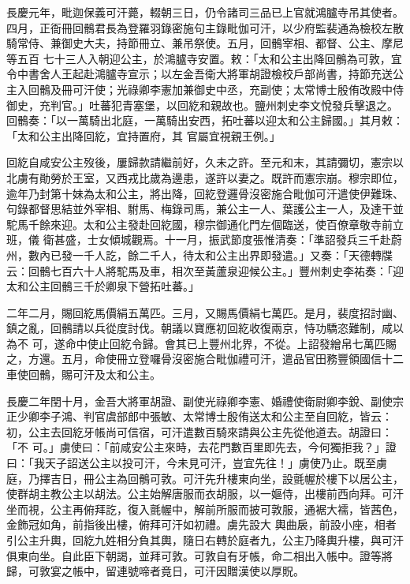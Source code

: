 \begin{pinyinscope}
 長慶元年，毗迦保義可汗薨，輟朝三日，仍令諸司三品已上官就鴻臚寺吊其使者。四月，正衙冊回鶻君長為登羅羽錄密施句主錄毗伽可汗，以少府監裴通為檢校左散騎常侍、兼御史大夫，持節冊立、兼吊祭使。五月，回鶻宰相、都督、公主、摩尼等五百
 七十三人入朝迎公主，於鴻臚寺安置。敕：「太和公主出降回鶻為可敦，宜令中書舍人王起赴鴻臚寺宣示；以左金吾衛大將軍胡證檢校戶部尚書，持節充送公主入回鶻及冊可汗使；光祿卿李憲加兼御史中丞，充副使；太常博士殷侑改殿中侍御史，充判官。」吐蕃犯青塞堡，以回紇和親故也。鹽州刺史李文悅發兵擊退之。回鶻奏：「以一萬騎出北庭，一萬騎出安西，拓吐蕃以迎太和公主歸國。」其月敕：「太和公主出降回紇，宜持置府，其
 官屬宜視親王例。」



 回紇自咸安公主歿後，屢歸款請繼前好，久未之許。至元和末，其請彌切，憲宗以北虜有勛勞於王室，又西戎比歲為邊患，遂許以妻之。既許而憲宗崩。穆宗即位，逾年乃封第十妹為太和公主，將出降，回紇登邏骨沒密施合毗伽可汗遣使伊難珠、句錄都督思結並外宰相、駙馬、梅錄司馬，兼公主一人、葉護公主一人，及達干並駝馬千餘來迎。太和公主發赴回紇國，穆宗御通化門左個臨送，使百僚章敬寺前立班，儀
 衛甚盛，士女傾城觀焉。十一月，振武節度張惟清奏：「準詔發兵三千赴蔚州，數內已發一千人訖，餘二千人，待太和公主出界即發遣。」又奏：「天德轉牒云：回鶻七百六十人將駝馬及車，相次至黃蘆泉迎候公主。」豐州刺史李祐奏：「迎太和公主回鶻三千於卿泉下營拓吐蕃。」



 二年二月，賜回紇馬價絹五萬匹。三月，又賜馬價絹七萬匹。是月，裴度招討幽、鎮之亂，回鶻請以兵從度討伐。朝議以寶應初回紇收復兩京，恃功驕恣難制，咸以為不
 可，遂命中使止回紇令歸。會其已上豐州北界，不從。上詔發繒帛七萬匹賜之，方還。五月，命使冊立登囉骨沒密施合毗伽禮可汗，遣品官田務豐領國信十二車使回鶻，賜可汗及太和公主。



 長慶二年閏十月，金吾大將軍胡證、副使光祿卿李憲、婚禮使衛尉卿李銳、副使宗正少卿李子鴻、判官虞部郎中張敏、太常博士殷侑送太和公主至自回紇，皆云：初，公主去回紇牙帳尚可信宿，可汗遣數百騎來請與公主先從他道去。胡證曰：「不
 可。」虜使曰：「前咸安公主來時，去花門數百里即先去，今何獨拒我？」證曰：「我天子詔送公主以投可汗，今未見可汗，豈宜先往！」虜使乃止。既至虜庭，乃擇吉日，冊公主為回鶻可敦。可汗先升樓東向坐，設氈幄於樓下以居公主，使群胡主教公主以胡法。公主始解唐服而衣胡服，以一嫗侍，出樓前西向拜。可汗坐而視，公主再俯拜訖，復入氈幄中，解前所服而披可敦服，通裾大襦，皆茜色，金飾冠如角，前指後出樓，俯拜可汗如初禮。虜先設大
 輿曲扆，前設小座，相者引公主升輿，回紇九姓相分負其輿，隨日右轉於庭者九，公主乃降輿升樓，與可汗俱東向坐。自此臣下朝謁，並拜可敦。可敦自有牙帳，命二相出入帳中。證等將歸，可敦宴之帳中，留連號啼者竟日，可汗因贈漢使以厚貺。




\end{pinyinscope}
